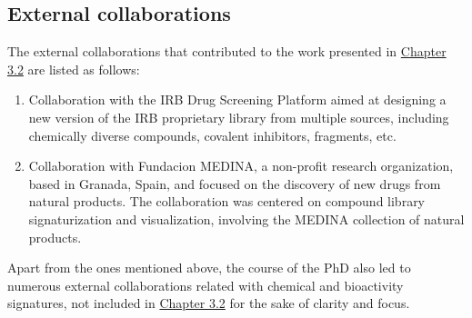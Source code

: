 \clearpage
{}
\subsection{External collaborations}

The external collaborations that contributed to the work presented in \hyperlink{Chapter_3.2}{Chapter 3.2} are listed as follows:

\begin{enumerate} 
\item[\textbullet] Collaboration with the IRB Drug Screening Platform aimed at designing a new version of the IRB proprietary library from multiple sources, including chemically diverse compounds, covalent inhibitors, fragments, etc. 
\item[\textbullet] Collaboration with Fundacion MEDINA, a non-profit research organization, based in Granada, Spain, and focused on the discovery of new drugs from natural products. The collaboration was centered on compound library signaturization and visualization, involving the MEDINA collection of natural products.
\end{enumerate}

Apart from the ones mentioned above, the course of the PhD also led to numerous external collaborations related with chemical and bioactivity signatures, not included in \hyperlink{Chapter_3.2}{Chapter 3.2} for the sake of clarity and focus. 

